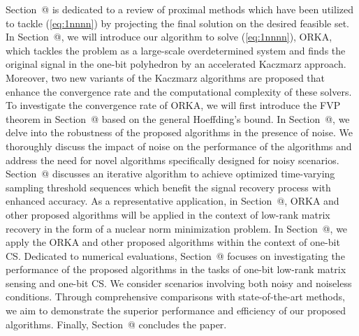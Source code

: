 \documentclass[12pt,draftcls,onecolumn]{IEEEtran}
\makeatletter
\newcommand*{\rom}[1]{\expandafter\@slowromancap\romannumeral #1@}
\makeatother
\begin{document}
Section~\rom{2} is dedicated to a review of proximal methods which have been utilized to tackle (\ref{eq:1nnnn}) by projecting the final solution on the desired feasible set. In Section~\rom{3}, we will introduce our algorithm to solve (\ref{eq:1nnnn}), ORKA, which tackles the problem as a large-scale overdetermined system and finds the original signal in the one-bit polyhedron by an accelerated Kaczmarz approach. Moreover, two new variants of the Kaczmarz algorithms are proposed that enhance the convergence rate and the computational complexity of these solvers. To investigate the convergence rate of ORKA, we will first introduce the FVP theorem in Section~\rom{4} based on the general Hoeffding's bound. In Section~\rom{5}, we delve into the robustness of the proposed algorithms in the presence of noise. We thoroughly discuss the impact of noise on the performance of the algorithms and address the need for novel algorithms specifically designed for noisy scenarios. Section~\rom{6} discusses an iterative algorithm to achieve optimized time-varying sampling threshold sequences which benefit the signal recovery process with enhanced accuracy. As a representative application, in Section~\rom{7}, ORKA and other proposed algorithms will be applied in the  context of low-rank matrix recovery in the form of a nuclear norm minimization problem. In Section~\rom{8}, we apply the ORKA and other proposed algorithms within the context of one-bit CS.
Dedicated to numerical evaluations, Section~\rom{9} focuses on investigating the performance of the proposed algorithms in the tasks of one-bit low-rank matrix sensing and one-bit CS. We consider scenarios involving both noisy and noiseless conditions. Through comprehensive comparisons with state-of-the-art methods, we aim to demonstrate the superior performance and efficiency of our proposed algorithms. 
Finally, Section~\rom{10} concludes the paper.
\end{document}
